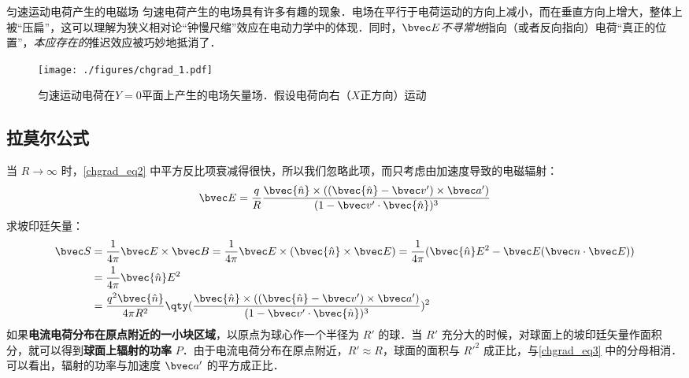 \begin{example}{匀速运动电荷产生的电磁场}
匀速电荷产生的电场具有许多有趣的现象．电场在平行于电荷运动的方向上减小，而在垂直方向上增大，整体上被“压扁”，这可以理解为狭义相对论“钟慢尺缩”效应在电动力学中的体现．同时，$\bvec E$\textsl{不寻常地}指向（或者反向指向）电荷“真正的位置”，\textsl{本应存在的}推迟效应被巧妙地抵消了\cite{GriffE}．

\begin{figure}[ht]
\centering
\texttt{[image: ./figures/chgrad\_1.pdf]}
\caption{匀速运动电荷在$Y=0$平面上产生的电场矢量场．假设电荷向右（$X$正方向）运动} \label{chgrad_fig1}
\end{figure}
\end{example}

\subsection{拉莫尔公式}
当 $R\rightarrow \infty$ 时，\autoref{chgrad_eq2} 中平方反比项衰减得很快，所以我们忽略此项，而只考虑由加速度导致的电磁辐射：
\begin{equation}
\bvec E=\frac{q}{R}\frac{\bvec{\hat n}\times ((\bvec{\hat n}-\bvec v')\times \bvec a')}{(1-\bvec v'\cdot \bvec{\hat n})^3}
\end{equation}
求坡印廷矢量：
\begin{equation}\label{chgrad_eq3}
\begin{aligned}
\bvec S&=\frac{1}{4\pi}\bvec E\times \bvec B=\frac{1}{4\pi}\bvec E\times (\bvec{\hat n}\times \bvec E)=\frac{1}{4\pi}(\bvec{\hat n}E^2-\bvec E(\bvec n\cdot \bvec E))\\
&=\frac{1}{4\pi}\bvec {\hat n}E^2\\
&=\frac{q^2\bvec{\hat n}}{4\pi R^2}\qty(\frac{\bvec{\hat n}\times ((\bvec{\hat n}-\bvec v')\times \bvec a')}{(1-\bvec v'\cdot \bvec{\hat n})^3})^2
\end{aligned}
\end{equation}
如果\textbf{电流电荷分布在原点附近的一小块区域}，以原点为球心作一个半径为 $R'$ 的球．当 $R'$ 充分大的时候，对球面上的坡印廷矢量作面积分，就可以得到\textbf{球面上辐射的功率} $P$．由于电流电荷分布在原点附近，$R'\approx R$，球面的面积与 $R'^2$ 成正比，与\autoref{chgrad_eq3} 中的分母相消．可以看出，辐射的功率与加速度 $\bvec a'$ 的平方成正比．

